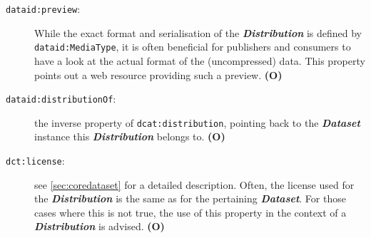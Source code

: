 \documentclass[a4paper,english,twoside,BCOR1.5cm,headsepline,DIV12,appendixprefix,final,12pt]{scrbook}
\newcommand{\prop}[1]{{{\texttt{#1}}}}
\newcommand{\important}[1]{\textbf{\textit{#1}}}
\begin{document}
\begin{description}
\item[\prop{dataid:preview}:] While the exact format and serialisation of the \important{Distribution} is defined by \prop{dataid:MediaType}, it is often beneficial for publishers and consumers to have a look at the actual format of the (uncompressed) data. This property points out a web resource providing such a preview. \textbf{(O)}
\item[\prop{dataid:distributionOf}:] the inverse property of \prop{dcat:distribution}, pointing back to the \important{Dataset} instance this \important{Distribution} belongs to. \textbf{(O)}
\item[\prop{dct:license}:] see \cref{sec:coredataset} for a detailed description. Often, the license used for the \important{Distribution} is the same as for the pertaining \important{Dataset}. For those cases where this is not true, the use of this property in the context of a \important{Distribution} is advised. \textbf{(O)}
\end{description}
\end{document}
